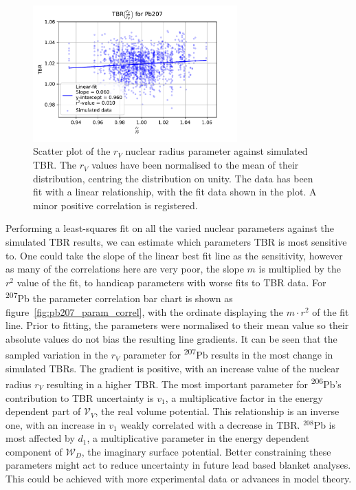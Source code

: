 \begin{figure}[H]
  \centering
	\includegraphics[width=0.7\textwidth]{Pb207_rvadjust}
	\caption[TBR as a function of $r_{V}$ for $^{207}$Pb.]{Scatter plot of the $r_{V}$ nuclear radius parameter against simulated TBR. The $r_{V}$ values have been normalised to the mean of their distribution, centring the distribution on unity. The data has been fit with a linear relationship, with the fit data shown in the plot. A minor positive correlation is registered.}
	\label{fig:pb207_rvadjust}
\end{figure}

Performing a least-squares fit on all the varied nuclear parameters against the simulated TBR results, we can estimate which parameters TBR is most sensitive to. One could take the slope of the linear best fit line as the sensitivity, however as many of the correlations here are very poor, the slope $m$ is multiplied by the $r^{2}$ value of the fit, to handicap parameters with worse fits to TBR data. For \textsuperscript{207}Pb the parameter correlation bar chart is shown as figure~\ref{fig:pb207_param_correl}, with the ordinate displaying the $m \cdot r^{2}$ of the fit line. Prior to fitting, the parameters were normalised to their mean value so their absolute values do not bias the resulting line gradients. It can be seen that the sampled variation in the $r_{V}$ parameter for \textsuperscript{207}Pb results in the most change in simulated TBRs. The gradient is positive, with an increase value of the nuclear radius $r_{V}$ resulting in a higher TBR. The most important parameter for \textsuperscript{206}Pb's contribution to TBR uncertainty is $v_{1}$, a multiplicative factor in the energy dependent part of $\mathcal{V}_{V}$, the real volume potential. This relationship is an inverse one, with an increase in $v_{1}$ weakly correlated with a decrease in TBR. $^{208}$Pb is most affected by $d_{1}$, a multiplicative parameter in the energy dependent component of $\mathcal{W}_{D}$, the imaginary surface potential. Better constraining these parameters might act to reduce uncertainty in future lead based blanket analyses. This could be achieved with more experimental data or advances in model theory.

